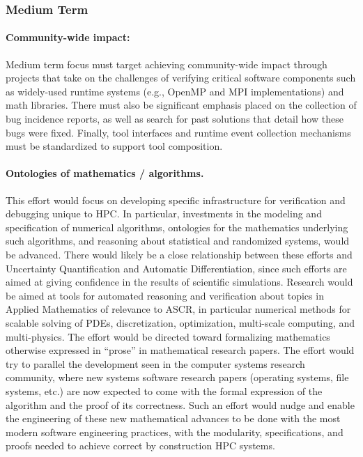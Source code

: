 \subsubsection{Medium Term}

\paragraph{Community-wide impact:} Medium term focus must target achieving community-wide impact  through projects that take on the challenges of 
verifying critical software components such as  widely-used runtime systems (e.g., OpenMP and MPI implementations) and math libraries.
%
There must also be significant emphasis placed on the collection of bug incidence reports, as well as search for past solutions that detail how these bugs were fixed.
%
Finally,  tool interfaces and runtime event collection mechanisms must be standardized to support tool composition.



\paragraph{Ontologies of mathematics / algorithms.}
This effort would focus on developing specific infrastructure for verification and debugging unique to HPC.  In particular, investments in the modeling and specification of numerical algorithms, ontologies for the mathematics underlying such algorithms, and reasoning about statistical and randomized systems, would be advanced.  There would likely be a close relationship between these efforts and Uncertainty Quantification and Automatic Differentiation, since such efforts are aimed at giving confidence in the results of scientific simulations.  Research would be aimed at tools for automated reasoning and verification about topics in Applied Mathematics of relevance to ASCR, in particular numerical methods for scalable solving of PDEs, discretization, optimization, multi-scale computing, and multi-physics. The effort would be directed toward formalizing mathematics otherwise expressed in ``prose'' in mathematical research papers.  The effort would try to parallel the development seen in the computer systems research community, where new systems software research papers (operating systems, file systems, etc.) are now expected to come with the formal expression of the algorithm and the proof of its correctness.  Such an effort would nudge and enable the engineering of these new mathematical advances to be done with the most modern software engineering practices, with the modularity, specifications, and proofs needed to achieve correct by construction HPC systems.  


